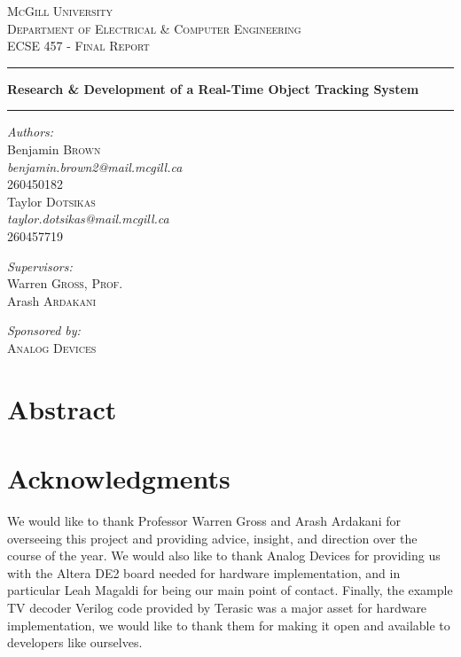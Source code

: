 \documentclass[11pt]{article} %
\newcommand{\HRule}[1][\medskipamount]{\par
  \vspace*{\dimexpr-\parskip-\baselineskip+#1}
  \noindent\rule{\linewidth}{0.2mm}\par
  \vspace*{\dimexpr-\parskip-.5\baselineskip+#1}}
\begin{document}
\begin{titlepage}
\begin{center}
\textsc{\huge McGill University}\\[1.5cm]
\textsc{\LARGE Department of Electrical \& Computer Engineering}\\[1.5cm]
\textsc{\Large ECSE 457 - Final Report}\\[3cm]
\HRule
{\huge \bfseries Research \& Development of a Real-Time Object Tracking System \\[.3cm] }
\HRule 
\vspace{1.5cm}
\noindent
\begin{minipage}{0.4\textwidth}
\begin{flushleft} \large
\emph{\Large Authors:}\\
\vspace{.2cm}
Benjamin \textsc{Brown} \\
\textit{benjamin.brown2@mail.mcgill.ca} \\
260450182 \\
\vspace{.2cm}
Taylor \textsc{Dotsikas} \\
\textit{taylor.dotsikas@mail.mcgill.ca} \\
260457719
\end{flushleft}
\begin{flushleft} \large
\emph{\Large Supervisors:}\\
\vspace{.2cm}
Warren \textsc{Gross, Prof.}\\
\vspace{.2cm}
Arash \textsc{Ardakani} 
\end{flushleft}
\begin{flushleft} \large
\emph{\Large Sponsored by:}\\
\vspace{.2cm}
\textsc{Analog Devices}\\
\end{flushleft}
\end{minipage}%
\end{center}
\end{titlepage}
\pagebreak
\section*{Abstract}

\section*{Acknowledgments}
We would like to thank Professor Warren Gross and Arash Ardakani for overseeing this project and providing advice, insight, and direction over the course of the year. We would also like to thank Analog Devices for providing us with the Altera DE2 board needed for hardware implementation, and in particular Leah Magaldi for being our main point of contact. Finally, the example TV decoder Verilog code provided by Terasic was a major asset for hardware implementation, we would like to thank them for making it open and available to developers like ourselves. 
\pagebreak
\tableofcontents
\pagebreak
\end{document}
